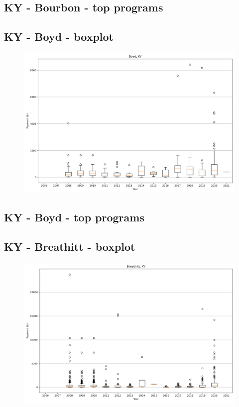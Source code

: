 \subsection*{KY - Bourbon - top programs}

\newpage
\subsection*{KY - Boyd - boxplot}
\begin{figure}[h]
\centering
\includegraphics[width=7in]{../output/boxplots/counties/Boyd-KY_boxplot.png}
\end{figure}


\subsection*{KY - Boyd - top programs}

\newpage
\subsection*{KY - Breathitt - boxplot}
\begin{figure}[h]
\centering
\includegraphics[width=7in]{../output/boxplots/counties/Breathitt-KY_boxplot.png}
\end{figure}


